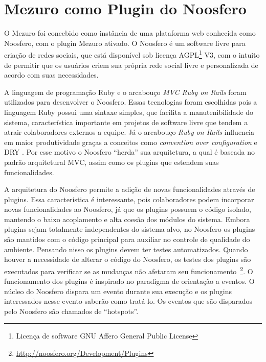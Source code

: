 \section{Mezuro como Plugin do Noosfero}

O Mezuro foi concebido como instância de uma plataforma web conhecida como Noosfero, com o plugin Mezuro ativado. O Noosfero é um software livre para criação de redes sociais, que está disponível sob licença AGPL\footnote{Licença de software GNU Affero General Public License} V3, com o intuito de permitir que os usuários criem sua própria rede social livre e personalizada de acordo com suas necessidades.

A linguagem de programação Ruby e o arcabouço\textit{ MVC Ruby on Rails} foram utilizados para desenvolver o Noosfero. Essas tecnologias foram escolhidas pois a linguagem Ruby possui uma sintaxe simples, que facilita a manutenibilidade do sistema, característica importante em projetos de software livre que tendem a atrair colaboradores externos a equipe. Já o arcabouço \textit{Ruby on Rails} influencia em maior produtividade graças a conceitos como \textit{convention over configuration} e DRY . Por esse motivo o Noosfero ``herda'' sua arquitetura, a qual é baseada no padrão arquitetural MVC, assim como os plugins que estendem suas funcionalidades.

A arquitetura do Noosfero permite a adição de novas funcionalidades através de plugins. Essa característica é interessante, pois colaboradores podem incorporar novas funcionalidades ao Noosfero, já que os plugins possuem o código isolado, mantendo o baixo acoplamento e alta coesão dos módulos do sistema.
%
Embora plugins sejam totalmente independentes do sistema alvo, no Noosfero os plugins são mantidos com o código principal para auxiliar no controle de qualidade do ambiente. Pensando nisso os plugins devem ter testes automatizados. Quando houver a necessidade de alterar o código do Noosfero, os testes dos plugins são executados para verificar se as mudanças não afetaram seu funcionamento~\footnote{\url{http://noosfero.org/Development/Plugins}}.
%
O funcionamento dos plugins é inspirado no paradigma de orientação a eventos. O núcleo do Noosfero dispara um evento durante sua execução e os plugins interessados nesse evento saberão como tratá-lo. Os eventos que são disparados pelo Noosfero são chamados de “hotspots”.

